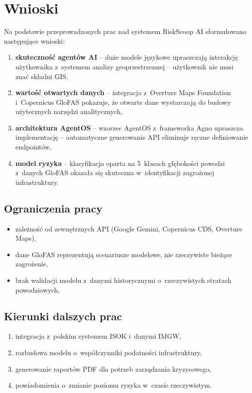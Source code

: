 
\section*{Wnioski}

Na podstawie przeprowadzonych prac nad systemem RiskScoop AI sformułowano następujące wnioski:

\begin{enumerate}
    \item \textbf{skuteczność agentów AI} -- duże modele językowe upraszczają interakcję użytkownika z~systemem analizy geoprzestrzennej -- użytkownik nie musi znać składni GIS,

    \item \textbf{wartość otwartych danych} -- integracja z~Overture Maps Foundation i~Copernicus GloFAS pokazuje, że otwarte dane wystarczają do budowy użytecznych narzędzi analitycznych,

    \item \textbf{architektura AgentOS} -- wzorzec AgentOS z~frameworka Agno upraszcza implementację -- automatyczne generowanie API eliminuje ręczne definiowanie endpointów,

    \item \textbf{model ryzyka} -- klasyfikacja oparta na 5~klasach głębokości powodzi z~danych GloFAS okazała się skuteczna w~identyfikacji zagrożonej infrastruktury.
\end{enumerate}

\subsection*{Ograniczenia pracy}

\begin{itemize}
    \item zależność od zewnętrznych API (Google Gemini, Copernicus CDS, Overture Maps),
    \item dane GloFAS reprezentują scenariusze modelowe, nie rzeczywiste bieżące zagrożenie,
    \item brak walidacji modelu z~danymi historycznymi o~rzeczywistych stratach powodziowych.
\end{itemize}

\subsection*{Kierunki dalszych prac}

\begin{enumerate}
    \item integracja z~polskim systemem ISOK i~danymi IMGW,
    \item rozbudowa modelu o~współczynniki podatności infrastruktury,
    \item generowanie raportów PDF dla potrzeb zarządzania kryzysowego,
    \item powiadomienia o~zmianie poziomu ryzyka w~czasie rzeczywistym.
\end{enumerate}

